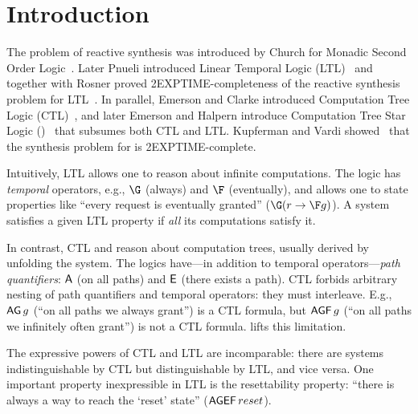 \section{Introduction} \label{sec:intro}

The problem of reactive synthesis was introduced by Church for Monadic Second Order Logic~\cite{Church63}.
Later Pnueli introduced Linear Temporal Logic (LTL)~\cite{pnueli1977temporal}
and together with Rosner proved 2EXPTIME-completeness
of the reactive synthesis problem for LTL~\cite{DBLP:conf/popl/PnueliR89}.
In parallel, Emerson and Clarke introduced Computation Tree Logic (CTL)~\cite{ctl-origin},
and later Emerson and Halpern introduce Computation Tree Star Logic (\CTLstar)~\cite{ctlstar-origin}
that subsumes both CTL and LTL.
Kupferman and Vardi showed~\cite{informatio} that the synthesis problem for \CTLstar is 2EXPTIME-complete.

Intuitively, LTL allows one to reason about infinite computations.
The logic has \emph{temporal} operators, e.g., $\G$ (always) and $\F$ (eventually),
and allows one to state properties like ``every request is eventually granted''
($\G(r \impl \F g)$).
A system satisfies a given LTL property if \emph{all} its computations satisfy it.

In contrast, CTL and \CTLstar reason about computation trees,
usually derived by unfolding the system.
The logics have---in addition to temporal operators---\emph{path quantifiers}:
${\operatorname{\mathsf{A}}}$ (on all paths) and ${\operatorname{\mathsf{E}}}$ (there exists a path).
CTL forbids arbitrary nesting of path quantifiers and temporal operators:
they must interleave.
E.g.,
$\operatorname{\mathsf{AG}} g$ (``on all paths we always grant'') is a CTL formula,
but $\operatorname{\mathsf{AGF}} g$ (``on all paths we infinitely often grant'') is not a CTL formula.
\CTLstar lifts this limitation.

The expressive powers of CTL and LTL are incomparable:
there are systems indistinguishable by CTL but distinguishable by LTL, and vice versa.
One important property inexpressible in LTL is the resettability property:
``there is always a way to reach the `reset' state'' ($\operatorname{\mathsf{AGEF}} reset$).


